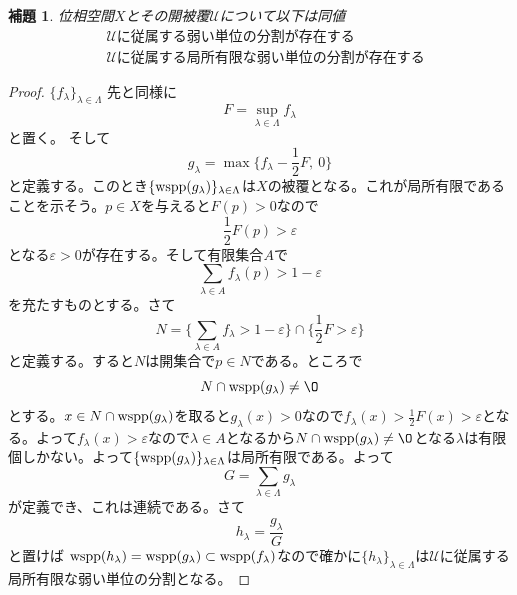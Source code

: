 \documentclass[leqno]{jsarticle}
\newtheorem{lem}[thm]{補題}
\newcommand{\ep}{\varepsilon}
\newcommand{\la}{\lambda}
\newcommand{\La}{\Lambda}
\newcommand{\lil}{\la\in \La}
\newcommand{\wsp}{\text{{\rm wspp}}}
\begin{document}
\begin{lem}\label{unit}
位相空間$X$とその開被覆$\mathcal{U}$について以下は同値
\begin{align}
&\mbox{$\mathcal{U}$に従属する弱い単位の分割が存在する}\\
&\mbox{$\mathcal{U}$に従属する局所有限な弱い単位の分割が存在する}
\end{align}
\end{lem}
\begin{proof}
$\{f_{\la}\}_{\lil}$
先と同様に
\[
F=\sup_{\lil}f_{\la}
\]
と置く。
そして
\[
g_{\la}=\max\{f_{\la}-\frac{1}{2}F,\ 0\}
\]
と定義する。このとき$\{\wsp(g_{\la})\}_{\lil}$は$X$の被覆となる。これが局所有限であることを示そう。$p\in X$を与えると$F(p)>0$なので
\[
\frac{1}{2}F(p)>\ep
\]
となる$\ep>0$が存在する。そして有限集合$A$で
\[
\sum_{\la \in A}f_{\la}(p)>1-\ep
\]
を充たすものとする。さて
\[
N=\{\sum_{\la \in A}f_{\la}>1-\ep\}\cap \{\frac{1}{2}F>\ep\}
\]
と定義する。すると$N$は開集合で$p\in N$である。ところで
\[
N\cap \wsp(g_{\la})\neq \O
\]
とする。$x\in N\cap \wsp(g_{\la})$を取ると$g_{\la}(x)>0$なので$f_{\la}(x)>\frac{1}{2}F(x)>\ep$となる。よって$f_{\la}(x)>\ep$なので$\la \in A$となるから$N\cap \wsp(g_{\la})\neq \O$となる$\la$は有限個しかない。よって$\{\wsp(g_{\la})\}_{\lil}$は局所有限である。よって
\[
G=\sum_{\la\in \La}g_{\la}
\]
が定義でき、これは連続である。さて
\[
h_{\la}=\frac{g_{\la}}{G}
\]
と置けば
$\wsp(h_{\la})=\wsp(g_{\la})\subset \wsp(f_{\la})$なので確かに$\{h_{\la}\}_{\lil}$は$\mathcal{U}$に従属する局所有限な弱い単位の分割となる。
\end{proof}
\end{document}
